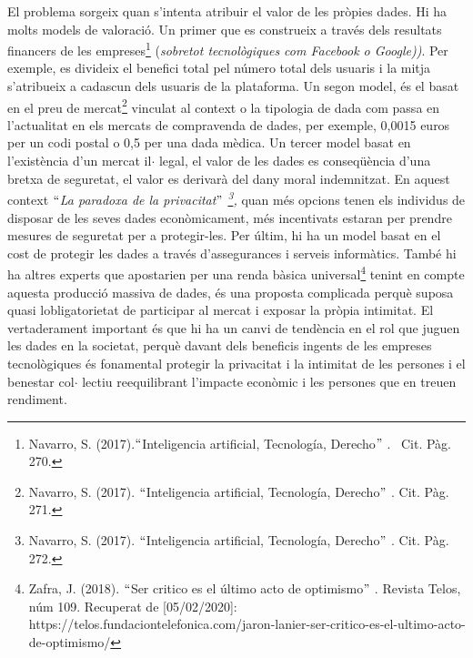 \documentclass[12pt]{article}
\renewcommand{\_}{\kern-1.5pt\textunderscore\kern-1.5pt}
\begin{document}
\begin{itemize}
\vspace{\baselineskip}
\begin{justify}
El problema sorgeix quan s’intenta atribuir el valor de les pròpies dades. Hi ha molts models de valoració. Un primer que es construeix a través dels resultats financers de les empreses\footnote{ Navarro, S. (2017).$``$Inteligencia artificial, Tecnología, Derecho$"$ . \  Cit. Pàg. 270. } (\textit{sobretot tecnològiques com Facebook o Google))}. Per exemple,  es divideix el benefici total pel número total dels usuaris i la mitja s’atribueix a cadascun dels usuaris de la plataforma. Un segon model, és el basat en el preu de mercat\footnote{ Navarro, S. (2017). $``$Inteligencia artificial, Tecnología, Derecho$"$ .  Cit. Pàg. 271. } vinculat al context o la tipologia de dada com passa en l’actualitat en els mercats de compravenda de dades, per exemple, 0,0015 euros per un codi postal o 0,5 per una dada mèdica. Un tercer model basat en l’existència d’un mercat il$ \cdot $ legal, el valor de les dades es conseqüència d’una bretxa de seguretat, el valor es derivarà del dany moral indemnitzat. En aquest context \textit{$``$La paradoxa de la privacitat$"$ \footnote{ Navarro, S. (2017). $``$Inteligencia artificial, Tecnología, Derecho$"$ .  Cit.  Pàg. 272. }, }quan més opcions tenen els individus de disposar de les seves dades econòmicament, més incentivats estaran per prendre mesures de seguretat per a protegir-les. Per últim, hi ha un model basat en el cost de protegir les dades a través d’assegurances i serveis informàtics. També hi ha altres experts que apostarien per una renda bàsica universal\footnote{ Zafra, J. (2018). $``$Ser critico es el último acto de optimismo$"$ . Revista Telos, núm 109. Recuperat de [05/02/2020]: https://telos.fundaciontelefonica.com/jaron-lanier-ser-critico-es-el-ultimo-acto-de-optimismo/ } tenint en compte aquesta producció massiva de dades, és una proposta complicada perquè suposa quasi lobligatorietat de participar al mercat i exposar la pròpia intimitat.  El vertaderament important és que hi ha un canvi de tendència en el rol que juguen les dades en la societat, perquè davant dels beneficis ingents de les empreses tecnològiques és fonamental protegir la privacitat i la intimitat de les persones i el benestar col$ \cdot $ lectiu reequilibrant l’impacte econòmic i les persones que en treuen rendiment. 
\end{justify}\par



\end{itemize}
\end{document}
